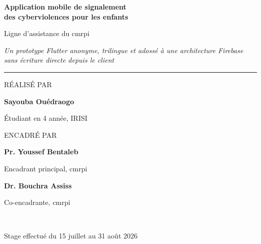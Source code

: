 \documentclass[11pt,a4paper,oneside,openany]{report}
\begin{document}
\begin{titlepage}
\vspace{12mm}

{\sffamily\bfseries\LARGE\color{emcblue}
 Application mobile de signalement\\[2mm]
 des cyberviolences pour les enfants\par}

\vspace{5mm}
{\sffamily\large\color{emcslate}Ligne d'assistance \emc du \gls{cmrpi}\par}

\vspace{4mm}
{\itshape\color{emcgrey}\small
 Un prototype Flutter anonyme, trilingue et adossé à une architecture Firebase
 sans écriture directe depuis le client\par}

\vspace{14mm}
{\color{emcborder}\rule{0.5\textwidth}{0.6pt}}
\vspace{10mm}

\begin{minipage}[t]{0.46\textwidth}\raggedright
 {\sffamily\small\color{emcgrey}RÉALISÉ PAR\par}\vspace{2mm}
 {\sffamily\bfseries\large\color{emcslate}Sayouba Ouédraogo\par}
 {\small\color{emcgrey}Étudiant en 4\ieme{} année, IRISI\par}
\end{minipage}\hfill
\begin{minipage}[t]{0.46\textwidth}\raggedleft
 {\sffamily\small\color{emcgrey}ENCADRÉ PAR\par}\vspace{2mm}
 {\sffamily\bfseries\large\color{emcslate}Pr. Youssef Bentaleb\par}
 {\small\color{emcgrey}Encadrant principal, \gls{cmrpi}\par}\vspace{1.5mm}
 {\sffamily\bfseries\color{emcslate}Dr. Bouchra Assiss\par}
 {\small\color{emcgrey}Co-encadrante, \gls{cmrpi}\par}
\end{minipage}

\vfill
\noindent{\color{emcborder}\rule{\textwidth}{1pt}}\\[2mm]
{\sffamily\small\color{emcgrey}Stage effectué du 15 juillet au 31 août 2026\par}
\end{titlepage}
\end{document}
